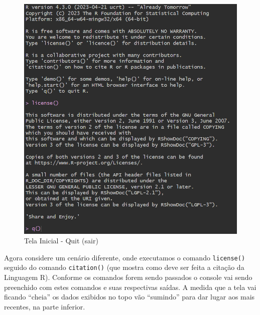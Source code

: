 \documentclass[
  letterpaper,
  DIV=11,
  numbers=noendperiod]{scrreprt}
\begin{document}
\begin{figure}

{\centering \includegraphics{./images/r/intro/tela_inicial_quit.png}

}

\caption{\label{fig-r-intro-tela-inicial-quit}Tela Inicial - Quit
(sair)}

\end{figure}

Agora considere um cenário diferente, onde executamos o comando
\texttt{license()} seguido do comando \texttt{citation()} (que mostra
como deve ser feita a citação da Linguagem R). Conforme os comandos
forem sendo passados o console vai sendo preenchido com estes comandos e
suas respectivas saídas. A medida que a tela vai ficando ``cheia'' os
dados exibidos no topo vão ``sumindo'' para dar lugar aos mais recentes,
na parte inferior.
\end{document}
